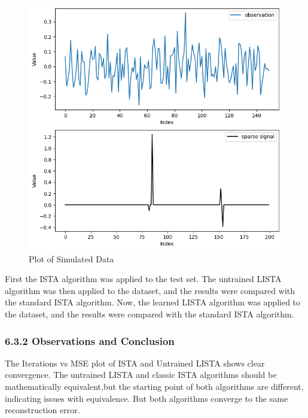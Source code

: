 \documentclass[
  letterpaper,
  DIV=11,
  numbers=noendperiod]{scrartcl}
\begin{document}
\begin{figure}[H]

{\centering \includegraphics[width=1\linewidth,height=\textheight,keepaspectratio]{abar-cs_files/mediabag/sample_seed.png}

}

\caption{Plot of Simulated Data}

\end{figure}%

First the ISTA algorithm was applied to the test set. The untrained
LISTA algorithm was then applied to the dataset, and the results were
compared with the standard ISTA algorithm. Now, the learned LISTA
algorithm was applied to the dataset, and the results were compared with
the standard ISTA algorithm.

\subsubsection{6.3.2 Observations and
Conclusion}\label{observations-and-conclusion}

The Iterations vs MSE plot of ISTA and Untrained LISTA shows clear
convergence. The untrained LISTA and classic ISTA algorithms should be
mathematically equivalent,but the starting point of both algorithms are
different, indicating issues with equivalence. But both algorithms
converge to the same reconstruction error.
\end{document}
